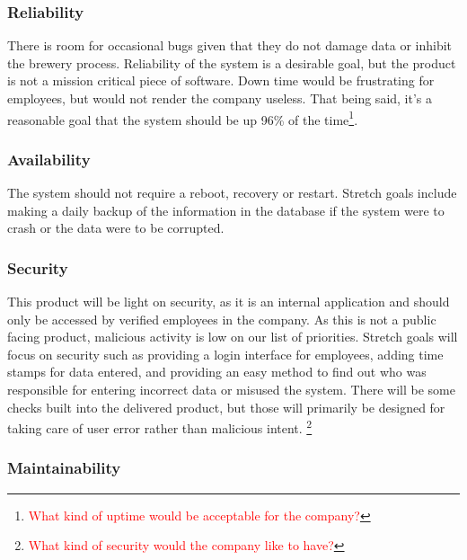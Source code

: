 \documentclass[draftclsnofoot,onecolumn,letterpaper,10pt,compsoc]{IEEEtran}
\newcommand\question[1]{\footnote{\textcolor{red}{#1}}}
\begin{document}
		\subsubsection{Reliability}

		There is room for occasional bugs given that they do not damage data or inhibit the brewery process.
		Reliability of the system is a desirable goal, but the product is not a mission critical piece of software.
		Down time would be frustrating for employees, but would not render the company useless.
		That being said, it’s a reasonable goal that the system should be up 96\% of the time\question{What kind of uptime would be acceptable for the company?}.

		\subsubsection{Availability}

		The system should not require a reboot, recovery or restart.
		Stretch goals include making a daily backup of the information in the database if the system were to crash or the data were to be corrupted.

		\subsubsection{Security}

		This product will be light on security, as it is an internal application and should only be accessed by verified employees in the company.
		As this is not a public facing product, malicious activity is low on our list of priorities.
		Stretch goals will focus on security such as providing a login interface for employees, adding time stamps for data entered, and providing an easy method to find out who was responsible for entering incorrect data or misused the system.
		There will be some checks built into the delivered product, but those will primarily be designed for taking care of user error rather than malicious intent.
		\question{What kind of security would the company like to have?}

		\subsubsection{Maintainability}
\end{document}
